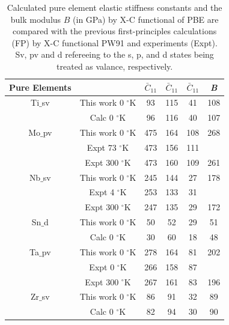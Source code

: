 \newpage
\begin{table}[H]
	\caption{Calculated pure element elastic stiffness constants and the bulk modulus $B$ (in GPa) by X-C functional of PBE are compared with the previous first-principles calculations (FP) by X-C functional PW91 and experiments (Expt). Sv, pv and d refereeing to the s, p, and d states being treated as valance, respectively.}
	\centering
	\begin{tabular}{ c c c c c c }
		\hline
		Pure Elements & & $\bar{C}_{11}$ & $\bar{C}_{11}$  & $\bar{C}_{11}$ & \textit{B}\\
		\hline
		Ti$\_$sv & This work 0 $^\circ$K & 93 & 115 & 41 & 108\\
		& Calc 0 $^\circ$K \cite{Shang2010b} & 96 & 116 & 40 & 107\\
		Mo$\_$pv & This work 0 $^\circ$K & 475 & 164 & 108 & 268\\
		& Expt 73 $^\circ$K \cite{Simmons1971b} & 473 & 156 & 111 &\\
		& Expt 300 $^\circ$K \cite{Dickinson1967a} & 473 & 160 & 109 & 261\\
		Nb$\_$sv & This work 0 $^\circ$K & 245 & 144 & 27 & 178\\
		& Expt 4 $^\circ$K \cite{Simmons1971b} & 253 & 133 & 31 & \\
		& Expt 300 $^\circ$K \cite{Bolef1961} & 247 & 135 & 29 & 172\\
		Sn$\_$d & This work 0 $^\circ$K & 50 & 52 & 29 & 51\\
		& Calc 0 $^\circ$K \cite{Shang2010b} & 30 & 60 & 18 & 48\\
		Ta$\_$pv & This work 0 $^\circ$K & 278 & 164 & 81 & 202\\
		& Expt 0 $^\circ$K \cite{Simmons1971b} & 266 & 158 & 87 & \\
		& Expt 300 $^\circ$K \cite{Bolef1961} & 267 & 161 & 83 & 196\\
		Zr$\_$sv & This work 0 $^\circ$K & 86 & 91 & 32 & 89\\
		& Calc 0 $^\circ$K \cite{Shang2010b} & 82 & 94 & 30 & 90\\
		\hline
	\end{tabular}
	\label{Ch5-table:pureeleelas}
\end{table}
\clearpage

